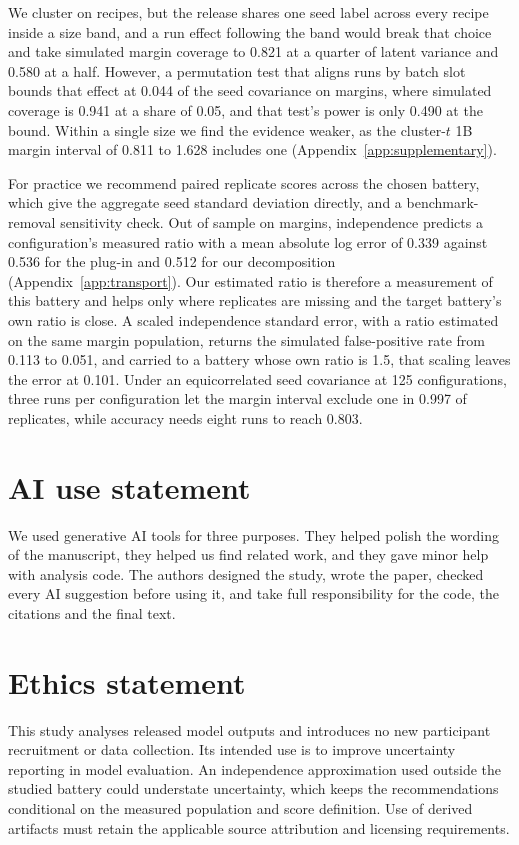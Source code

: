 \documentclass{article}
\begin{document}
We cluster on recipes, but the release shares one seed label across every recipe inside a size band, and a run effect following the band would break that choice and take simulated margin coverage to 0.821 at a quarter of latent variance and 0.580 at a half. However, a permutation test that aligns runs by batch slot bounds that effect at 0.044 of the seed covariance on margins, where simulated coverage is 0.941 at a share of 0.05, and that test's power is only 0.490 at the bound. Within a single size we find the evidence weaker, as the cluster-$t$ 1B margin interval of 0.811 to 1.628 includes one (Appendix~\ref{app:supplementary}).

For practice we recommend paired replicate scores across the chosen battery, which give the aggregate seed standard deviation directly, and a benchmark-removal sensitivity check. Out of sample on margins, independence predicts a configuration's measured ratio with a mean absolute log error of 0.339 against 0.536 for the plug-in and 0.512 for our decomposition (Appendix~\ref{app:transport}). Our estimated ratio is therefore a measurement of this battery and helps only where replicates are missing and the target battery's own ratio is close. A scaled independence standard error, with a ratio estimated on the same margin population, returns the simulated false-positive rate from 0.113 to 0.051, and carried to a battery whose own ratio is 1.5, that scaling leaves the error at 0.101. Under an equicorrelated seed covariance at 125 configurations, three runs per configuration let the margin interval exclude one in 0.997 of replicates, while accuracy needs eight runs to reach 0.803.

\label{maintext:end}
\section*{AI use statement}
We used generative AI tools for three purposes. They helped polish the wording of the manuscript, they helped us find related work, and they gave minor help with analysis code. The authors designed the study, wrote the paper, checked every AI suggestion before using it, and take full responsibility for the code, the citations and the final text.

\section*{Ethics statement}
This study analyses released model outputs and introduces no new participant recruitment or data collection. Its intended use is to improve uncertainty reporting in model evaluation. An independence approximation used outside the studied battery could understate uncertainty, which keeps the recommendations conditional on the measured population and score definition. Use of derived artifacts must retain the applicable source attribution and licensing requirements.
\end{document}
